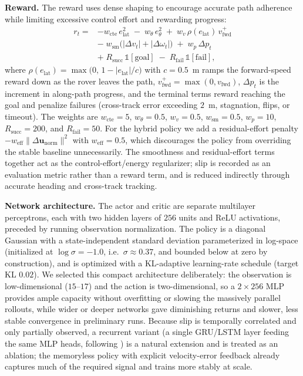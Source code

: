 \documentclass[conference]{IEEEtran}
\begin{document}
\noindent\textbf{Reward.} The reward uses dense shaping to encourage accurate path adherence while limiting excessive control effort and rewarding progress:
\begin{align}
r_t = &-w_{\text{cte}}\, e_{\text{lat}}^2 \;-\; w_{\theta}\, e_{\theta}^2 \;+\; w_{v}\, \rho(e_{\text{lat}})\, v_{\text{fwd}}^{+} \nonumber\\
& -\; w_{\text{sm}}\big(|\Delta v_t| + |\Delta\omega_t|\big) \;+\; w_{p}\, \Delta p_t \nonumber\\
& +\; R_{\text{succ}}\,\mathbb{1}[\text{goal}] \;-\; R_{\text{fail}}\,\mathbb{1}[\text{fail}],
\end{align}
where $\rho(e_{\text{lat}}) = \max\!\big(0,\,1 - |e_{\text{lat}}|/c\big)$ with $c=0.5$~m ramps the forward-speed reward down as the rover leaves the path, $v_{\text{fwd}}^{+}=\max(0,v_{\text{fwd}})$, $\Delta p_t$ is the increment in along-path progress, and the terminal terms reward reaching the goal and penalize failures (cross-track error exceeding $2$~m, stagnation, flips, or timeout). The weights are $w_{\text{cte}}=5$, $w_{\theta}=0.5$, $w_{v}=0.5$, $w_{\text{sm}}=0.5$, $w_{p}=10$, $R_{\text{succ}}=200$, and $R_{\text{fail}}=50$. For the hybrid policy we add a residual-effort penalty $-w_{\text{eff}}\lVert\Delta\mathbf{u}_{\text{norm}}\rVert^2$ with $w_{\text{eff}}=0.5$, which discourages the policy from overriding the stable baseline unnecessarily. The smoothness and residual-effort terms together act as the control-effort/energy regularizer; slip is recorded as an evaluation metric rather than a reward term, and is reduced indirectly through accurate heading and cross-track tracking.

\noindent\textbf{Network architecture.} The actor and critic are separate multilayer perceptrons, each with two hidden layers of $256$ units and ReLU activations, preceded by running observation normalization. The policy is a diagonal Gaussian with a state-independent standard deviation parameterized in log-space (initialized at $\log\sigma=-1.0$, i.e.\ $\sigma\approx0.37$, and bounded below at zero by construction), and is optimized with a KL-adaptive learning-rate schedule (target KL $0.02$). We selected this compact architecture deliberately: the observation is low-dimensional ($15$--$17$) and the action is two-dimensional, so a $2\times256$ MLP provides ample capacity without overfitting or slowing the massively parallel rollouts, while wider or deeper networks gave diminishing returns and slower, less stable convergence in preliminary runs. Because slip is temporally correlated and only partially observed, a recurrent variant (a single GRU/LSTM layer feeding the same MLP heads, following \cite{alcayaga2025lstm}) is a natural extension and is treated as an ablation; the memoryless policy with explicit velocity-error feedback already captures much of the required signal and trains more stably at scale.
\end{document}

